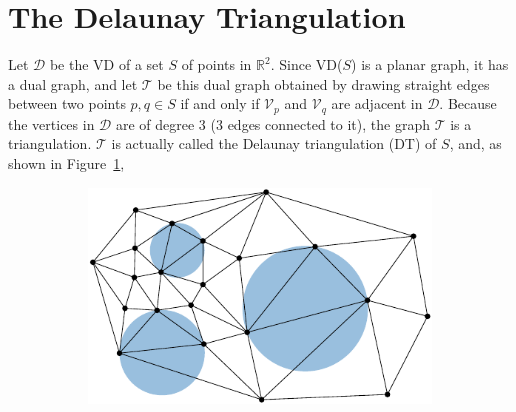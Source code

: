 %
\section{The Delaunay Triangulation}
\label{sec:dt_definition}

Let $\mathcal{D}$ be the VD of a set $S$ of points in $\mathbb{R}^2$. 
Since VD($S$) is a planar graph, it has a dual graph, and let $\mathcal{T}$ be this dual graph obtained by drawing straight edges between two points $p,q \in S$ if and only if $\mathcal{V}_{p}$ and $\mathcal{V}_{q}$ are adjacent in $\mathcal{D}$. 
Because the vertices in $\mathcal{D}$ are of degree 3 (3 edges connected to it), the graph $\mathcal{T}$ is a triangulation. 
$\mathcal{T}$ is actually called the Delaunay triangulation (DT) of $S$, and, as shown in Figure~\ref{fig:dt2da}, 
\begin{figure}
  \centering
  \begin{subfigure}[b]{0.45\linewidth}
    \includegraphics[width=\textwidth]{figs/dt2d_2}
    \caption{}\label{fig:dt2da}
  \end{subfigure}%
  \qquad
  \begin{subfigure}[b]{0.3\linewidth}

\end{subfigure}
\end{figure}

